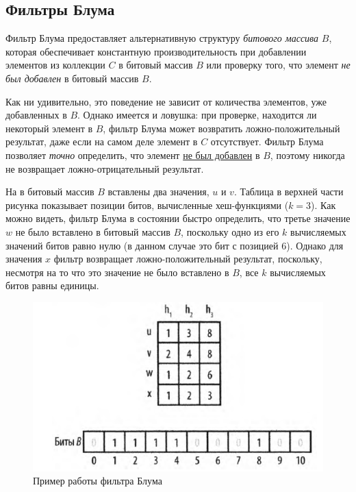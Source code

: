 \documentclass[%
	11pt,
	a4paper,
	utf8,
		]{article}
\begin{document}
\subsection{Фильтры Блума}

Фильтр Блума предоставляет альтернативную структуру \emph{битового массива} $ B $, которая обеспечивает константную производительность при добавлении элементов из коллекции $ C $ в битовый массив $ B $ или проверку того, что элемент \emph{не был добавлен} в битовый массив $ B $. 

Как ни удивительно, это поведение не зависит от количества элементов, уже добавленных в $ B $. Однако имеется и ловушка: при проверке, находится ли некоторый элемент в $ B $, фильтр Блума может возвратить ложно-положительный результат, даже если на самом деле элемент в $ C $ отсутствует. Фильтр Блума позволяет \emph{точно} определить, что элемент \underline{не был добавлен} в $ B $, поэтому никогда не возвращает ложно-отрицательный результат.

На  в битовый массив $ B $ вставлены два значения, $ u $ и $ v $. Таблица в верхней части рисунка показывает позиции битов, вычисленные хеш-функциями ($ k = 3 $). Как можно видеть, фильтр Блума в состоянии быстро определить, что третье значение $ w $ не было вставлено в битовый массив $ B $, поскольку одно из его $ k $ вычисляемых значений битов равно нулю (в данном случае это бит с позицией 6). Однако для значения $ x $ фильтр возвращает ложно-положительный результат, поскольку, несмотря на то что это значение не было вставлено в $ B $, все $ k $ вычисляемых битов равны единицы.

\begin{figure}[h]
	\centering
	\includegraphics[scale=0.85]{figures/filter_blum.png}
	\caption{ Пример работы фильтра Блума }\label{fig:filter_blum}
\end{figure}
\end{document}
